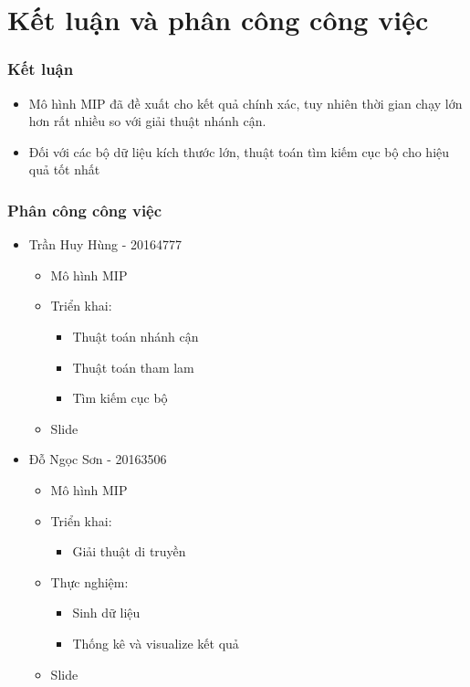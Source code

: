 \documentclass{beamer}
\begin{document}
	
	\section{Kết luận và phân công công việc}
	
	
	\begin{frame}
		\frametitle{Kết luận}
		\begin{itemize}
			\item Mô hình MIP đã đề xuất cho kết quả chính xác, tuy nhiên thời gian chạy lớn hơn rất nhiều so với giải thuật nhánh cận.
			\item Đối với các bộ dữ liệu kích thước lớn, thuật toán tìm kiếm cục bộ cho hiệu quả tốt nhất
		\end{itemize}
	\end{frame}

	\begin{frame}
		\frametitle{Phân công công việc}
		\begin{itemize}
			\item {Trần Huy Hùng - 20164777
				\begin{itemize}
					\item Mô hình MIP
					\item {Triển khai:
						\begin{itemize}
							\item Thuật toán nhánh cận
							\item Thuật toán tham lam
							\item Tìm kiếm cục bộ
						\end{itemize}
					}
					\item Slide
				\end{itemize}
			}
			\item {Đỗ Ngọc Sơn - 20163506
				\begin{itemize}
					\item Mô hình MIP
					\item {Triển khai:
						\begin{itemize}
							\item Giải thuật di truyền
						\end{itemize}
					}
					\item {Thực nghiệm:
						\begin{itemize}
							\item Sinh dữ liệu
							\item Thống kê và visualize kết quả
						\end{itemize}
					}
					\item Slide
				\end{itemize}
			}
		\end{itemize}
	\end{frame}
	
\end{document}
